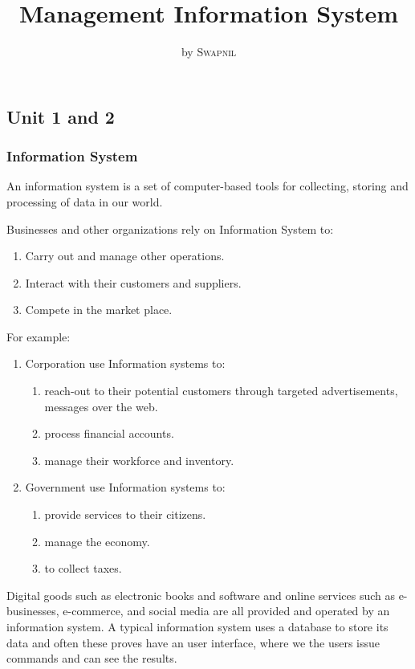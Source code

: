 \documentclass[twocolumn, 12pt, a4paper]{article}
\title{Management Information System}
\author{ by
  \textsc{Swapnil}%
}
\date{}
\begin{document}
\maketitle
\thispagestyle{empty}

\begin{tcolorbox}
\part{Unit 1 and 2}
\end{tcolorbox}

\section{Information System}
An information system is a set of computer-based tools for collecting, storing
and processing of data in our world.

Businesses and other organizations rely on Information System to:

\begin{enumerate}
  \item Carry out and manage other operations.
  \item Interact with their customers and suppliers.
  \item Compete in the market place.
\end{enumerate}

For example:
\begin{enumerate}
  \item Corporation use Information systems to:
    \begin{enumerate}
      \item reach-out to their potential customers through targeted
        advertisements, messages over the web.
      \item process financial accounts.
      \item manage their workforce and inventory.
    \end{enumerate}
  \item Government use Information systems to:
    \begin{enumerate}
      \item provide services to their citizens.
      \item manage the economy.
      \item to collect taxes.
    \end{enumerate}
\end{enumerate}

Digital goods such as electronic books and software and online services such as
e-businesses, e-commerce, and social media are all provided and operated by an
information system. A typical information system uses a database to store its
data and often these proves have an user interface, where we the users issue
commands and can see the results.
\end{document}
